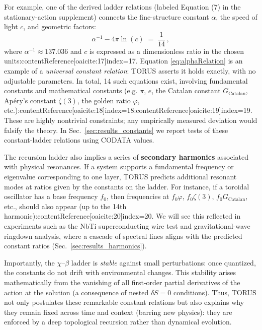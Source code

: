 \documentclass[12pt]{article}
\begin{document}
For example, one of the derived ladder relations (labeled Equation (7) in the stationary-action supplement) connects the fine-structure constant $\alpha$, the speed of light $c$, and geometric factors:
\begin{equation}
\alpha^{-1} - 4\pi \ln(c) \;=\; \frac{1}{14}\,,
\label{eq:alphaRelation}
\end{equation}
where $\alpha^{-1}\approx137.036$ and $c$ is expressed as a dimensionless ratio in the chosen units:contentReference[oaicite:17]{index=17}. Equation \eqref{eq:alphaRelation} is an example of a \emph{universal constant relation}: TORUS asserts it holds exactly, with no adjustable parameters. In total, 14 such equations exist, involving fundamental constants and mathematical constants (e.g. $\pi$, $e$, the Catalan constant $G$$_{\mathrm{Catalan}}$, Apéry’s constant $\zeta(3)$, the golden ratio $\varphi$, etc.):contentReference[oaicite:18]{index=18}:contentReference[oaicite:19]{index=19}. These are highly nontrivial constraints; any empirically measured deviation would falsify the theory. In Sec.~\ref{sec:results_constants} we report tests of these constant-ladder relations using CODATA values.

The recursion ladder also implies a series of \textbf{secondary harmonics} associated with physical resonances. If a system supports a fundamental frequency or eigenvalue corresponding to one layer, TORUS predicts additional resonant modes at ratios given by the constants on the ladder. For instance, if a toroidal oscillator has a base frequency $f_0$, then frequencies at $f_0 \varphi$, $f_0 \zeta(3)$, $f_0 G_{\mathrm{Catalan}}$, etc., should also appear (up to the 14th harmonic):contentReference[oaicite:20]{index=20}. We will see this reflected in experiments such as the NbTi superconducting wire test and gravitational-wave ringdown analysis, where a cascade of spectral lines aligns with the predicted constant ratios (Sec.~\ref{sec:results_harmonics}).

Importantly, the $\chi$–$\beta$ ladder is \emph{stable} against small perturbations: once quantized, the constants do not drift with environmental changes. This stability arises mathematically from the vanishing of all first-order partial derivatives of the action at the solution (a consequence of nested $\delta S=0$ conditions). Thus, TORUS not only postulates these remarkable constant relations but also explains why they remain fixed across time and context (barring new physics): they are enforced by a deep topological recursion rather than dynamical evolution.
\end{document}
